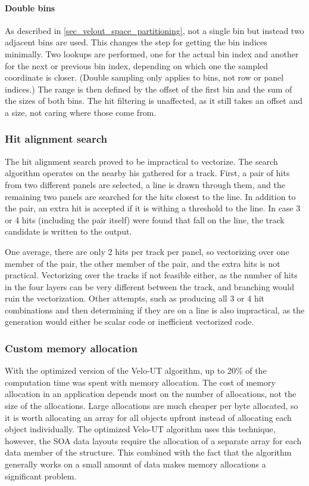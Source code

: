 \documentclass[12pt]{article}
\begin{document}
\paragraph{Double bins}

As described in \ref{sec_velout_space_partitioning}, not a single bin but instead two adjacent bins are used. This changes the step for getting the bin indices minimally. Two lookups are performed, one for the actual bin index and another for the next or previous bin index, depending on which one the sampled coordinate is closer. (Double sampling only applies to bins, not row or panel indices.) The range is then defined by the offset of the first bin and the sum of the sizes of both bins. The hit filtering is unaffected, as it still takes an offset and a size, not caring where those come from.


\subsubsection{Hit alignment search}

The hit alignment search proved to be impractical to vectorize. The search algorithm operates on the nearby his gathered for a track. First, a pair of hits from two different panels are selected, a line is drawn through them, and the remaining two panels are searched for the hits closest to the line. In addition to the pair, an extra hit is accepted if it is withing a threshold to the line. In case 3 or 4 hits (including the pair itself) were found that fall on the line, the track candidate is written to the output.

One average, there are only 2 hits per track per panel, so vectorizing over one member of the pair, the other member of the pair, and the extra hits is not practical. Vectorizing over the tracks if not feasible either, as the number of hits in the four layers can be very different between the track, and branching would ruin the vectorization. Other attempts, such as producing all 3 or 4 hit combinations and then determining if they are on a line is also impractical, as the generation would either be scalar code or inefficient vectorized code.


\subsubsection{Custom memory allocation} \label{sec_velout_stack_alloc}

With the optimized version of the Velo-UT algorithm, up to 20\% of the computation time was spent with memory allocation. The cost of memory allocation in an application depends most on the number of allocations, not the size of the allocations. Large allocations are much cheaper per byte allocated, so it is worth allocating an array for all objects upfront instead of allocating each object individually. The optimized Velo-UT algorithm uses this technique, however, the SOA data layouts require the allocation of a separate array for each data member of the structure. This combined with the fact that the algorithm generally works on a small amount of data makes memory allocations a significant problem.
\end{document}
